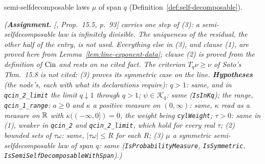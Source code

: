 \begin{proposition}
\begin{enumerate}
semi-selfdecomposable laws $\mu$ of span $q$ (Definition~\ref{def:self-decomposable}).
\end{enumerate}
\statusA\quad{}\quad\emph{(\textbf{Assignment.} 
[, Prop.~15.5, p.~93] carries one step of (3): a semi-selfdecomposable law is
infinitely divisible. The uniqueness of the residual, the other half of the entry, is not used.
Everything else in (3), and clause (1), are proved here from Lemma~\ref{lem:line-exponent-data};
clause (2) is proved from the definition of $\operatorname{Cin}$ and rests on no cited fact. The criterion
$T_q\nu \ge \nu$ of Sato's Thm.~15.8 is not cited: (3) proves its symmetric case on the line.
\textbf{Hypotheses} (the node's, each with what its declarations require): $q > 1$: same, and in
\texttt{qcin\_2\_limit} the limit $q \downarrow 1$ through $q > 1$; $\psi \in \mathcal{K}_q$: same
(\texttt{IsInKq}); the range, \texttt{qcin\_1\_range}: $a \ge 0$ and $\kappa$ a positive measure
on $(0,\infty)$: same, $\kappa$ read as a measure on $\mathbb{R}$ with $\kappa((-\infty,0]) = 0$, the
weight being \texttt{cylWeight}; $\tau > 0$: same in (1), weaker in \texttt{qcin\_2} and \texttt{qcin\_2\_limit},
which hold for every real $\tau$; (2) bounded sets of $\tau\omega$: same, $|\tau\omega| \le R$ for
each $R$; (3) $\mu$ a symmetric semi-selfdecomposable law of span $q$: same
(\texttt{IsProbabilityMeasure}, \texttt{IsSymmetric},
\texttt{IsSemiSelfDecomposableWithSpan}).)}
\end{proposition}

